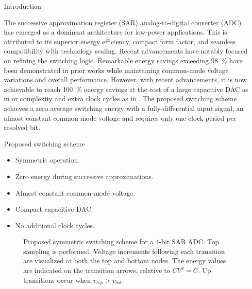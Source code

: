 \documentclass[final]{beamer}
\newlength{\colwidth}
\begin{document}
\begin{frame}[t]
\begin{columns}[t]
\begin{column}{\colwidth}
\begin{block}{Introduction}

The successive approximation register (SAR) analog-to-digital converter (ADC) has emerged as a dominant architecture for low-power applications. This is attributed to its superior energy efficiency, compact form factor, and seamless compatibility with technology scaling. Recent advancements have notably focused on refining the switching logic. Remarkable energy savings exceeding \SI{98}{\percent} have been demonstrated in prior works \cite{Wu17, Li20, Hu22, Momeni20} while maintaining common-mode voltage variations and overall performance. However, with recent advancements, it is now achievable to reach \SI{100}{\percent} energy savings at the cost of a large capacitive DAC as in \cite{Akbari19} or complexity and extra clock cycles as in \cite{Yousefi18}.    
% 
The proposed switching scheme achieves a zero average switching energy with a fully-differential input signal, an almost constant common-mode voltage and requires only one clock period per resolved bit.

  \end{block}


  \begin{block}{Proposed switching scheme}

    \begin{itemize}
      \item Symmetric operation.
      \item Zero energy during successive approximations.
      \item Almost constant common-mode voltage.
      \item Compact capacitive DAC.
      \item No additional clock cycles.
    \end{itemize}
    \vspace{-1cm}

      \begin{figure} \centering
              \centering
      	    
          	\caption{Proposed symmetric switching scheme for a 4-bit SAR ADC. Top sampling is performed. Voltage increments following each transition are visualized at both the top and bottom nodes. The energy values are indicated on the transition arrows, relative to $C V^2 = C$. Up transitions occur when $v_{top} > v_{bot}$.}
              \label{fig:scheme}
      \end{figure}


\end{block}
\end{column}
\end{columns}
\end{frame}
\end{document}
